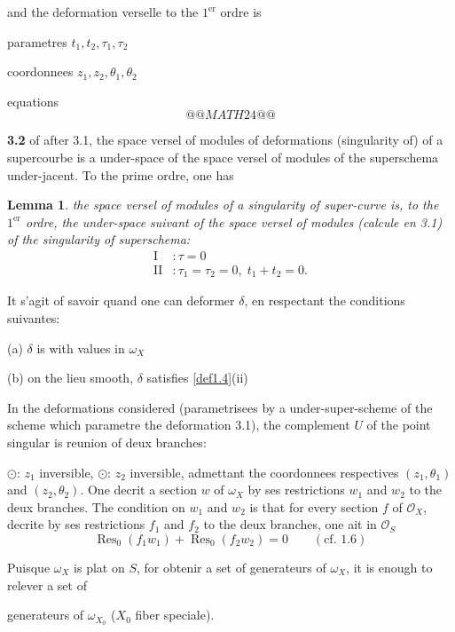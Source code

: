 \documentclass[11pt,a4paper]{article}
\theoremstyle{plain}
\newtheorem{lemma}[theorem]{Lemma}
\theoremstyle{definition}
\DeclareMathOperator{\Res}{Res}
\begin{document}
and the deformation verselle to the $1^{\text{er}}$ ordre is

parametres $t_1, t_2, \tau_1, \tau_2$

coordonnees $z_1, z_2, \theta_1, \theta_2$

equations
\[
@@MATH24@@
\]

\newpage

\noindent \textbf{3.2} of after 3.1, the space versel of modules of deformations (singularity of) of a supercourbe is a under-space of the space versel of modules of the superschema under-jacent. To the prime ordre, one has

\begin{lemma}\label{lem3.3}
the space versel of modules of a singularity of super-curve is, to the $1^{\text{er}}$ ordre, the under-space suivant of the space versel of modules (calcule en 3.1) of the singularity of superschema:
\[
\begin{aligned}
\text{I} &: \tau = 0 \\
\text{II} &: \tau_1 = \tau_2 = 0, \; t_1 + t_2 = 0.
\end{aligned}
\]
\end{lemma}

It s'agit of savoir quand one can deformer $\delta$, en respectant the conditions suivantes:

(a) $\delta$ is with values in $\omega_X$

(b) on the lieu smooth, $\delta$ satisfies \ref{def1.4}(ii)

In the deformations considered (parametrisees by a under-super-scheme of the scheme which parametre the deformation 3.1), the complement $U$ of the point singular is reunion of deux branches:

$\odot$: $z_1$ inversible, $\odot$: $z_2$ inversible, admettant the coordonnees respectives $(z_1, \theta_1)$ and $(z_2, \theta_2)$. One decrit a section $w$ of $\omega_X$ by ses restrictions $w_1$ and $w_2$ to the deux branches. The condition on $w_1$ and $w_2$ is that for every section $f$ of $\mathcal{O}_X$, decrite by ses restrictions $f_1$ and $f_2$ to the deux branches, one ait in $\mathcal{O}_S$
\[
\Res_0(f_1 w_1) + \Res_0(f_2 w_2) = 0 \qquad (\text{cf. 1.6})
\]

Puisque $\omega_X$ is plat on $S$, for obtenir a set of generateurs of $\omega_X$, it is enough to relever a set of

\newpage

generateurs of $\omega_{X_0}$ ($X_0$ fiber speciale).
\end{document}
